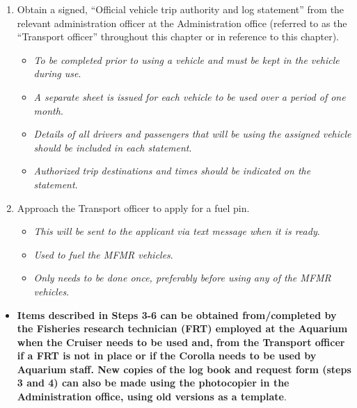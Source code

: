 \documentclass[
  12pt,
]{report}
\providecommand{\tightlist}{%
  \setlength{\itemsep}{0pt}\setlength{\parskip}{0pt}}\usepackage{longtable,booktabs,array}
\begin{document}
\begin{enumerate}
\def\labelenumi{\arabic{enumi}.}
\tightlist
\item
  Obtain a signed, ``Official vehicle trip authority and log statement''
  from the relevant administration officer at the Administration office
  (referred to as the ``Transport officer'' throughout this chapter or
  in reference to this chapter).

  \begin{itemize}
  \tightlist
  \item
    \emph{To be completed prior to using a vehicle and must be kept in
    the vehicle during use}.
  \item
    \emph{A separate sheet is issued for each vehicle to be used over a
    period of one month}.
  \item
    \emph{Details of all drivers and passengers that will be using the
    assigned vehicle should be included in each statement}.
  \item
    \emph{Authorized trip destinations and times should be indicated on
    the statement}.
  \end{itemize}
\item
  Approach the Transport officer to apply for a fuel pin.

  \begin{itemize}
  \tightlist
  \item
    \emph{This will be sent to the applicant via text message when it is
    ready}.
  \item
    \emph{Used to fuel the MFMR vehicles}.
  \item
    \emph{Only needs to be done once, preferably before using any of the
    MFMR vehicles}.
  \end{itemize}
\end{enumerate}

\begin{itemize}
\tightlist
\item
  \textbf{Items described in Steps 3-6 can be obtained from/completed by
  the Fisheries research technician (FRT) employed at the Aquarium when
  the Cruiser needs to be used and, from the Transport officer if a FRT
  is not in place or if the Corolla needs to be used by Aquarium staff.
  New copies of the log book and request form (steps 3 and 4) can also
  be made using the photocopier in the Administration office, using old
  versions as a template}.
\end{itemize}
\end{document}
